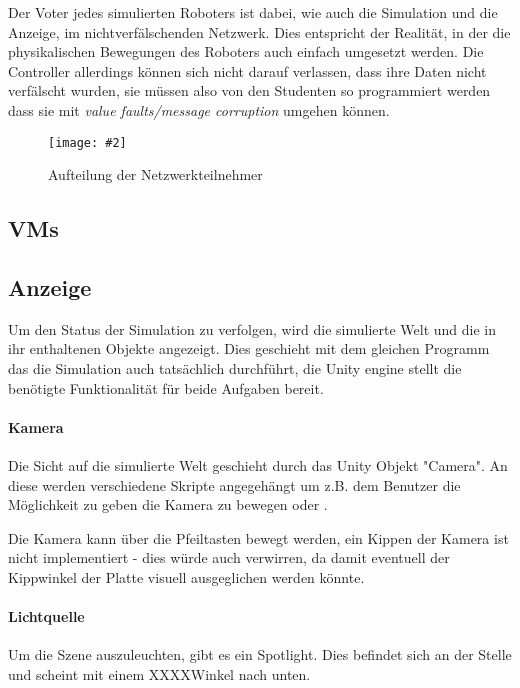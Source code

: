 \documentclass[
    12pt,
    bibliography=totoc,
    ngerman,
    enabledeprecatedfontcommands
]{scrartcl}
\newcommand{\includevisio}[2][]{\texttt{[image: \#2]}}
\begin{document}
Der Voter jedes simulierten Roboters ist dabei, wie auch die Simulation und die Anzeige, im nichtverf{\"{a}}lschenden Netzwerk. Dies entspricht der Realit{\"{a}}t, in der die physikalischen Bewegungen
des Roboters auch einfach umgesetzt werden. Die Controller allerdings k{\"{o}}nnen sich nicht darauf verlassen, dass ihre Daten nicht verf{\"{a}}lscht wurden, sie m{\"{u}}ssen also von den Studenten so
programmiert werden dass sie mit \textit{value faults/message corruption}\cite{richling-ass} umgehen k{\"{o}}nnen.

\begin{figure}
	\centering
	\includevisio[width=\textwidth]{Netzwerk}
	\caption{Aufteilung der Netzwerkteilnehmer}
	\label{fig:network}
\end{figure}

\subsection{VMs}

\subsection{Anzeige}\label{graphics}
Um den Status der Simulation zu verfolgen, wird die simulierte Welt und die in ihr enthaltenen Objekte angezeigt. Dies geschieht mit dem gleichen Programm das die Simulation auch tats{\"{a}}chlich
durchf{\"{u}}hrt, die Unity engine stellt die ben{\"{o}}tigte Funktionalit{\"{a}}t f{\"{u}}r beide Aufgaben bereit.

\paragraph{Kamera} Die Sicht auf die simulierte Welt geschieht durch das Unity Objekt "Camera". An diese werden verschiedene Skripte angegeh{\"{a}}ngt um z.B. dem Benutzer die M{\"{o}}glichkeit zu
geben die Kamera zu bewegen oder .

Die Kamera kann {\"{u}}ber die Pfeiltasten bewegt werden, ein Kippen der Kamera ist nicht implementiert - dies w{\"{u}}rde auch verwirren, da damit eventuell der Kippwinkel der
Platte visuell ausgeglichen werden k{\"{o}}nnte.

\paragraph{Lichtquelle} Um die Szene auszuleuchten, gibt es ein Spotlight. Dies befindet sich an der Stelle  und scheint mit einem XXXX\textdegree Winkel nach unten.
\end{document}
